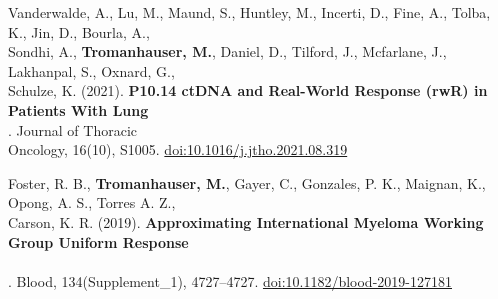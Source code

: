 \documentclass{resume} %
\begin{document}

\hspace*{1mm}Vanderwalde, A., Lu, M., Maund, S., Huntley, M., Incerti, D., Fine, A., Tolba, K., Jin, D., Bourla, A., \\
\hspace*{2mm}Sondhi, A., {\bf Tromanhauser, M.}, Daniel, D., Tilford, J., Mcfarlane, J., Lakhanpal, S., Oxnard, G., \\
\hspace*{2mm}Schulze, K. (2021). {\bf P10.14 ctDNA and Real-World Response (rwR) in Patients With Lung} \\
\hspace*{2mm}{\bf Cancer From A Prospective Real-World Clinico-Genomic (PCG) Study}. Journal of Thoracic \\
\hspace*{2mm}Oncology, 16(10), S1005. \href{https://doi.org/10.1016/j.jtho.2021.08.319}{doi:10.1016/j.jtho.2021.08.319}

\hspace*{1mm}Foster, R. B., {\bf Tromanhauser, M.}, Gayer, C., Gonzales, P. K., Maignan, K., Opong, A. S., Torres A. Z., \\
\hspace*{2mm}Carson, K. R. (2019). {\bf Approximating International Myeloma Working Group Uniform Response} \\
\hspace*{2mm}{\bf Criteria to Derive Response for Multiple Myeloma (MM) Patients Using Data from Electronic} \\
\hspace*{2mm}{\bf Health Records (EHR)}. Blood, 134(Supplement\_1), 4727–4727. \href{https://doi.org/10.1182/blood-2019-127181}{doi:10.1182/blood-2019-127181}

\end{document}
